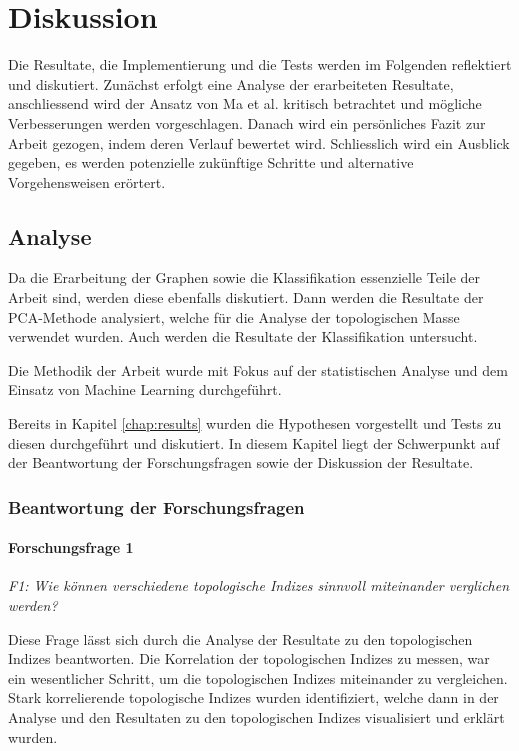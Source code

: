 \chapter{Diskussion}

Die Resultate, die Implementierung und die Tests werden im Folgenden reflektiert und diskutiert. 
Zunächst erfolgt eine Analyse der erarbeiteten Resultate, anschliessend wird der Ansatz von Ma et al. kritisch betrachtet und mögliche Verbesserungen werden vorgeschlagen. 
Danach wird ein persönliches Fazit zur Arbeit gezogen, indem deren Verlauf bewertet wird. 
Schliesslich wird ein Ausblick gegeben, es werden potenzielle zukünftige Schritte und alternative Vorgehensweisen erörtert.

\newpage

\section{Analyse}

Da die Erarbeitung der Graphen sowie die Klassifikation essenzielle Teile der Arbeit sind, werden diese ebenfalls diskutiert.
Dann werden die Resultate der PCA-Methode analysiert, welche für die Analyse der topologischen Masse verwendet wurden.
Auch werden die Resultate der Klassifikation untersucht.

Die Methodik der Arbeit wurde mit Fokus auf der statistischen Analyse und dem Einsatz von Machine Learning durchgeführt.

Bereits in Kapitel \ref{chap:results} wurden die Hypothesen vorgestellt und Tests zu diesen durchgeführt und diskutiert.
In diesem Kapitel liegt der Schwerpunkt auf der Beantwortung der Forschungsfragen sowie der Diskussion der Resultate.

\subsection{Beantwortung der Forschungsfragen}

\subsubsection{Forschungsfrage 1}

\textit{F1: Wie können verschiedene topologische Indizes sinnvoll miteinander verglichen werden?}

Diese Frage lässt sich durch die Analyse der Resultate zu den topologischen Indizes beantworten.
Die Korrelation der topologischen Indizes zu messen, war ein wesentlicher Schritt, um die topologischen Indizes miteinander zu vergleichen.
Stark korrelierende topologische Indizes wurden identifiziert, welche dann in der Analyse und den Resultaten zu den topologischen Indizes visualisiert und erklärt wurden.

